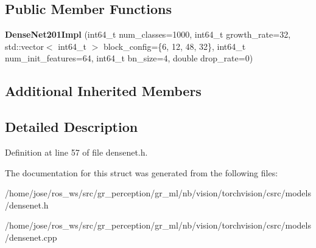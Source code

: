 \subsection*{Public Member Functions}
\begin{DoxyCompactItemize}
\item 
\mbox{\label{structvision_1_1models_1_1DenseNet201Impl_a1c3cf7f5f7ca274a87b73264770fdc24}} 
{\bfseries Dense\+Net201\+Impl} (int64\+\_\+t num\+\_\+classes=1000, int64\+\_\+t growth\+\_\+rate=32, std\+::vector$<$ int64\+\_\+t $>$ block\+\_\+config=\{6, 12, 48, 32\}, int64\+\_\+t num\+\_\+init\+\_\+features=64, int64\+\_\+t bn\+\_\+size=4, double drop\+\_\+rate=0)
\end{DoxyCompactItemize}
\subsection*{Additional Inherited Members}


\subsection{Detailed Description}


Definition at line 57 of file densenet.\+h.



The documentation for this struct was generated from the following files\+:\begin{DoxyCompactItemize}
\item 
/home/jose/ros\+\_\+ws/src/gr\+\_\+perception/gr\+\_\+ml/nb/vision/torchvision/csrc/models/densenet.\+h\item 
/home/jose/ros\+\_\+ws/src/gr\+\_\+perception/gr\+\_\+ml/nb/vision/torchvision/csrc/models/densenet.\+cpp\end{DoxyCompactItemize}
